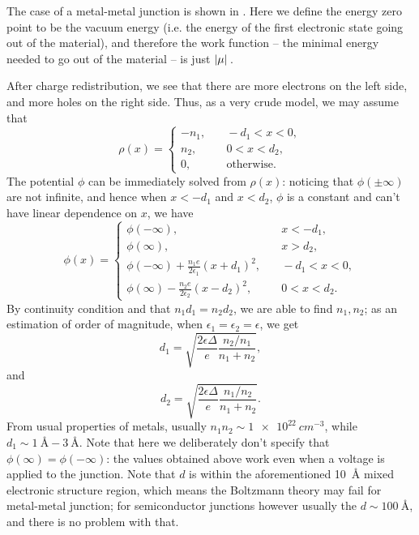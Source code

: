 \documentclass[hyperref, a4paper]{article}
\begin{document}
The case of a metal-metal junction is shown in .
Here we define the energy zero point to be the vacuum energy 
(i.e. the energy of the first electronic state going out of the material),
and therefore the work function -- 
the minimal energy needed to go out of the material -- 
is just $\abs*{\mu}$.

After charge redistribution,
we see that there are more electrons on the left side, 
and more holes on the right side.
Thus, as a very crude model, we may assume that 
\begin{equation}
    \rho(x) = \begin{cases}
        - n_1, & \quad - d_1 < x < 0, \\
        n_2  , & \quad 0 < x < d_2,   \\ 
        0,     & \quad \text{otherwise}.
    \end{cases}
\end{equation}
The potential $\phi$ can be immediately solved from $\rho(x)$:
noticing that $\phi(\pm \infty)$ are not infinite, 
and hence when $x < - d_1$ and $x < d_2$,
$\phi$ is a constant and can't have linear dependence on $x$,
we have 
\begin{equation}
    \phi(x) = \begin{cases}
        \phi(- \infty), & \quad x < - d_1, \\
        \phi(\infty),   & \quad x > d_2,   \\ 
        \phi(- \infty) + \frac{n_1 e}{2 \epsilon_1} (x + d_1)^2 , & \quad - d_1 < x < 0, \\
        \phi(\infty)   - \frac{n_2 e}{2 \epsilon_2} (x - d_2)^2,  & \quad 0 < x < d_2. 
    \end{cases}
\end{equation}
By continuity condition and that $n_1 d_1 = n_2 d_2$, 
we are able to find $n_1, n_2$;
as an estimation of order of magnitude, 
when $\epsilon_1 = \epsilon_2 = \epsilon$, we get 
\begin{equation}
    d_1 = \sqrt{\frac{2 \epsilon \Delta}{e} \frac{n_2 / n_1}{n_1 + n_2}} ,
\end{equation}
and 
\begin{equation}
    d_2 = \sqrt{\frac{2 \epsilon \Delta}{e} \frac{n_1 / n_2}{n_1 + n_2}} .
\end{equation}
From usual properties of metals,  
usually $n_1 n_2 \sim \SI{1e22}{cm^{-3}}$,
while $d_1 \sim \SI{1}{\angstrom}-\SI{3}{\angstrom}$.
Note that here we deliberately don't specify that $\phi(\infty) = \phi(-\infty)$:
the values obtained above work 
even when a voltage is applied to the junction.
Note that $d$ is within the aforementioned \SI{10}{\angstrom} mixed electronic structure region,
which means the Boltzmann theory may fail for 
metal-metal junction;
for semiconductor junctions however usually 
the $d \sim \SI{100}{\angstrom}$,
and there is no problem with that.
\end{document}
